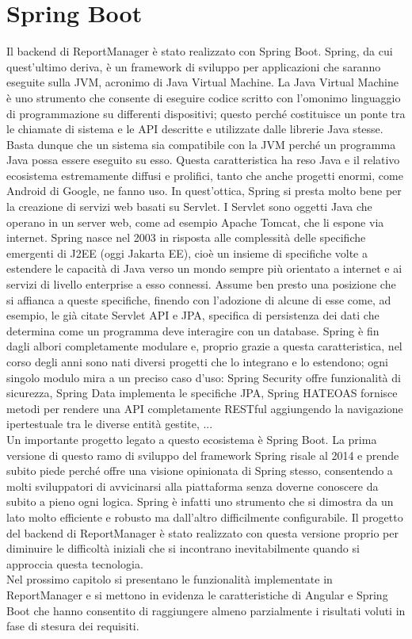 \section{Spring Boot}

Il backend di ReportManager è stato realizzato con Spring Boot.
Spring, da cui quest'ultimo deriva, è un framework di sviluppo per applicazioni che saranno eseguite sulla JVM, acronimo di Java Virtual Machine.
La Java Virtual Machine è uno strumento che consente di eseguire codice scritto con l'omonimo linguaggio di programmazione su differenti dispositivi; questo perché costituisce un ponte
tra le chiamate di sistema e le API descritte e utilizzate dalle librerie Java stesse.
Basta dunque che un sistema sia compatibile con la JVM perché un programma Java possa essere eseguito su esso.
Questa caratteristica ha reso Java e il relativo ecosistema estremamente diffusi e prolifici, tanto che anche progetti enormi, come Android di Google, ne fanno uso.
In quest'ottica, Spring si presta molto bene per la creazione di servizi web basati su Servlet.
I Servlet sono oggetti Java che operano in un server web, come ad esempio Apache Tomcat, che li espone via internet.
Spring nasce nel 2003 in risposta alle complessità delle specifiche emergenti di J2EE (oggi Jakarta EE), cioè un insieme di specifiche volte a estendere le capacità di Java verso un mondo sempre più
orientato a internet e ai servizi di livello enterprise a esso connessi.
Assume ben presto una posizione che si affianca a queste specifiche, finendo con l'adozione di alcune di esse come, ad esempio, le già citate Servlet API e JPA, specifica di persistenza
dei dati che determina come un programma deve interagire con un database.
Spring è fin dagli albori completamente modulare e, proprio grazie a questa caratteristica, nel corso degli anni sono nati diversi progetti che lo integrano e lo estendono;
ogni singolo modulo mira a un preciso caso d'uso: Spring Security offre funzionalità di sicurezza, Spring Data implementa le specifiche JPA, Spring HATEOAS fornisce metodi per rendere
una API completamente RESTful aggiungendo la navigazione ipertestuale tra le diverse entità gestite, ...
\\
Un importante progetto legato a questo ecosistema è Spring Boot.
La prima versione di questo ramo di sviluppo del framework Spring risale al 2014 e prende subito piede perché offre una visione opinionata di Spring stesso, consentendo a molti
sviluppatori di avvicinarsi alla piattaforma senza doverne conoscere da subito a pieno ogni logica.
Spring è infatti uno strumento che si dimostra da un lato molto efficiente e robusto ma dall'altro difficilmente configurabile.
Il progetto del backend di ReportManager è stato realizzato con questa versione proprio per diminuire le difficoltà iniziali che si incontrano inevitabilmente
quando si approccia questa tecnologia.
\\
Nel prossimo capitolo si presentano le funzionalità implementate in ReportManager e si mettono in evidenza le caratteristiche di Angular e Spring Boot che hanno consentito di raggiungere
almeno parzialmente i risultati voluti in fase di stesura dei requisiti.